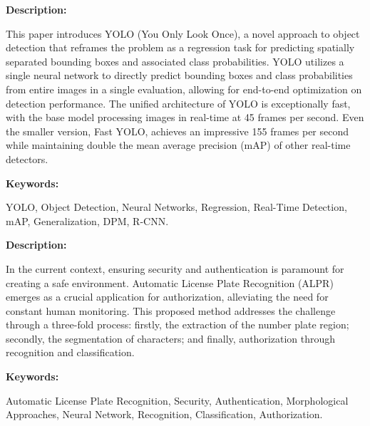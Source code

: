 { 
	
	\textbf{Description:}
	
	This paper introduces YOLO (You Only Look Once), a novel approach to object detection that reframes the problem as a regression task for predicting spatially separated bounding boxes and associated class probabilities. YOLO utilizes a single neural network to directly predict bounding boxes and class probabilities from entire images in a single evaluation, allowing for end-to-end optimization on detection performance. The unified architecture of YOLO is exceptionally fast, with the base model processing images in real-time at 45 frames per second. Even the smaller version, Fast YOLO, achieves an impressive 155 frames per second while maintaining double the mean average precision (mAP) of other real-time detectors.\autocite{Redmon:2016}

	
	\textbf{Keywords:} 
	
	YOLO, Object Detection, Neural Networks, Regression, Real-Time Detection, mAP, Generalization, DPM, R-CNN.
	
}





{ 
	
	\textbf{Description:}
	
	In the current context, ensuring security and authentication is paramount for creating a safe environment. Automatic License Plate Recognition (ALPR) emerges as a crucial application for authorization, alleviating the need for constant human monitoring. This proposed method addresses the challenge through a three-fold process: firstly, the extraction of the number plate region; secondly, the segmentation of characters; and finally, authorization through recognition and classification.\autocite{Sandha:2017}

	
	
	\textbf{Keywords:} 
	
	Automatic License Plate Recognition, Security, Authentication, Morphological Approaches, Neural Network, Recognition, Classification, Authorization.

	
}




